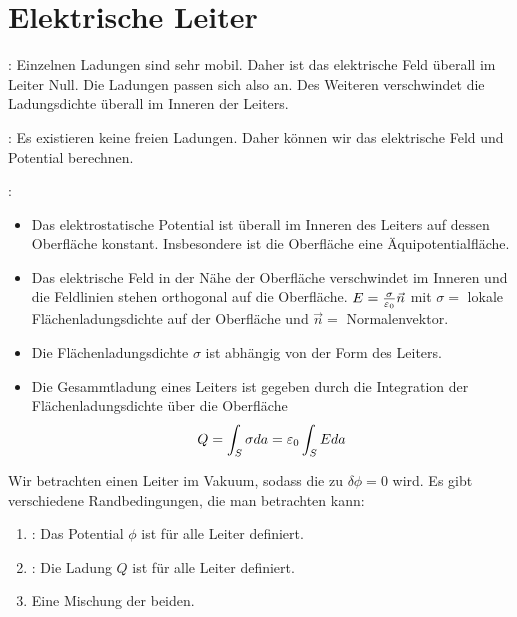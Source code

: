 \section{Elektrische Leiter}

\vspace{1\baselineskip}

:
Einzelnen Ladungen sind sehr mobil. Daher ist das elektrische Feld überall im Leiter Null.
Die Ladungen passen sich also an. Des Weiteren verschwindet die Ladungsdichte überall im
Inneren der Leiters.

\vspace{1\baselineskip}

: Es existieren keine freien Ladungen. Daher können wir das elektrische
Feld und Potential berechnen.

\vspace{1\baselineskip}

:
\begin{itemize}
    \item Das elektrostatische Potential ist überall im Inneren des Leiters auf dessen
            Oberfläche konstant. Insbesondere ist die Oberfläche eine Äquipotentialfläche.
    \item Das elektrische Feld in der Nähe der Oberfläche verschwindet im Inneren und die
            Feldlinien stehen orthogonal auf die Oberfläche.
            $E = \frac{\sigma}{\varepsilon_0} \vec{n}$ mit $\sigma =$ lokale Flächenladungsdichte
            auf der Oberfläche und $\vec{n} = $ Normalenvektor.
    \item Die Flächenladungsdichte $\sigma$ ist abhängig von der Form des Leiters.
    \item Die Gesammtladung eines Leiters ist gegeben durch die Integration der Flächenladungsdichte
            über die Oberfläche
            \begin{align*}
                Q = \int_S \sigma da = \varepsilon_0 \int_S E da
            \end{align*}
\end{itemize}

\vspace{1\baselineskip}


Wir betrachten einen Leiter im Vakuum, sodass die  zu
$\delta \phi = 0$ wird. Es gibt verschiedene Randbedingungen, die man betrachten kann:
\begin{enumerate}
    \item {}: Das Potential $\phi$ ist für alle Leiter definiert.
    \item {}: Die Ladung $Q$ ist für alle Leiter definiert.
    \item Eine Mischung der beiden.
\end{enumerate}

